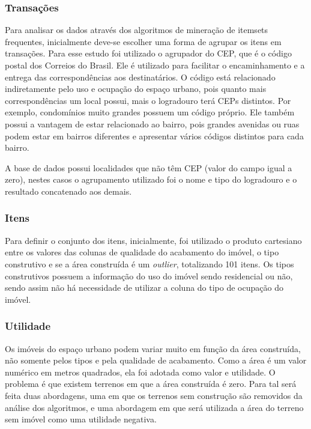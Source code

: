 \documentclass[12pt]{article}
\begin{document}
\subsubsection{Transações}
Para analisar os dados através dos algoritmos de mineração de itemsets frequentes, inicialmente deve-se escolher uma forma de agrupar os itens em transações. Para esse estudo foi utilizado o agrupador do CEP, que é o código postal dos Correios do Brasil. Ele é utilizado para facilitar o encaminhamento e a entrega das correspondências aos destinatários. O código está relacionado indiretamente pelo uso e ocupação do espaço urbano, pois quanto mais correspondências um local possui, mais o logradouro terá CEPs distintos. Por exemplo, condomínios muito grandes possuem um código próprio. Ele também possui a vantagem de estar relacionado ao bairro, pois grandes avenidas ou ruas podem estar em bairros diferentes e apresentar vários códigos distintos para cada bairro. 

A base de dados possui localidades que não têm CEP (valor do campo igual a zero), nestes casos o agrupamento utilizado foi o nome e tipo do logradouro e o resultado concatenado aos demais.
 
 \subsubsection{Itens}
 Para definir o conjunto dos itens, inicialmente, foi utilizado o produto cartesiano entre os valores das colunas de qualidade do acabamento do imóvel, o tipo construtivo e se a área construída é um \textit{outlier}, totalizando 101 itens. Os tipos construtivos possuem a informação do uso do imóvel sendo residencial ou não, sendo assim não há necessidade de utilizar a coluna do tipo de ocupação do imóvel.

 \subsubsection{Utilidade}
 Os imóveis do espaço urbano podem variar muito em função da área construída, não somente pelos tipos e pela qualidade de acabamento. Como a área é um valor numérico em metros quadrados, ela foi adotada como valor e utilidade. O problema é que existem terrenos em que a área construída é zero. Para tal será feita duas abordagens, uma em que os terrenos sem construção são removidos da análise dos algoritmos, e uma abordagem em que será utilizada a área do terreno sem imóvel como uma utilidade negativa.%
\end{document}
